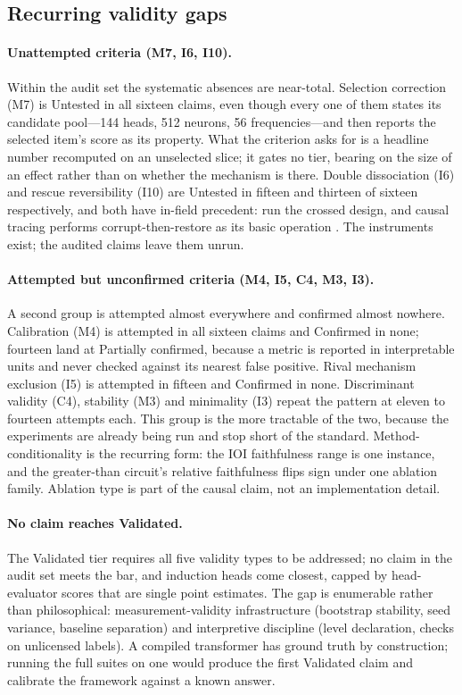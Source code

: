 \documentclass{article}
\begin{document}
\subsection{Recurring validity gaps}
\label{sec:gaps}

\paragraph{Unattempted criteria (M7, I6, I10).} Within the audit set the systematic absences are near-total. Selection correction (M7) is Untested in all sixteen claims, even though every one of them states its candidate pool---144 heads, 512 neurons, 56 frequencies---and then reports the selected item's score as its property. What the criterion asks for is a headline number recomputed on an unselected slice; it gates no tier, bearing on the size of an effect rather than on whether the mechanism is there. Double dissociation (I6) and rescue reversibility (I10) are Untested in fifteen and thirteen of sixteen respectively, and both have in-field precedent: \citet{feucht2025dual} run the crossed design, and causal tracing performs corrupt-then-restore as its basic operation \citep{meng2022locating}. The instruments exist; the audited claims leave them unrun.

\paragraph{Attempted but unconfirmed criteria (M4, I5, C4, M3, I3).} A second group is attempted almost everywhere and confirmed almost nowhere. Calibration (M4) is attempted in all sixteen claims and Confirmed in none; fourteen land at Partially confirmed, because a metric is reported in interpretable units and never checked against its nearest false positive. Rival mechanism exclusion (I5) is attempted in fifteen and Confirmed in none. Discriminant validity (C4), stability (M3) and minimality (I3) repeat the pattern at eleven to fourteen attempts each. This group is the more tractable of the two, because the experiments are already being run and stop short of the standard. Method-conditionality is the recurring form: the IOI faithfulness range is one instance, and the greater-than circuit's relative faithfulness flips sign under one ablation family. Ablation type is part of the causal claim, not an implementation detail.

\paragraph{No claim reaches Validated.} The Validated tier requires all five validity types to be addressed; no claim in the audit set meets the bar, and induction heads come closest, capped by head-evaluator scores that are single point estimates. The gap is enumerable rather than philosophical: measurement-validity infrastructure (bootstrap stability, seed variance, baseline separation) and interpretive discipline (level declaration, checks on unlicensed labels). A compiled transformer \citep{lindner2023interp} has ground truth by construction; running the full suites on one would produce the first Validated claim and calibrate the framework against a known answer.
\end{document}
